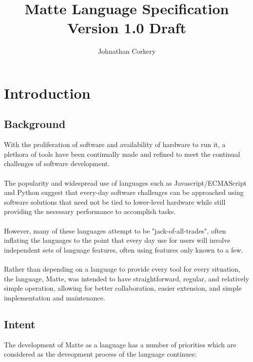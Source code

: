 \documentclass[12pt,letterpaper]{report}
\author{Johnathan Corkery}
\title{Matte Language Specification\\
\small Version 1.0 Draft
}
\begin{document}
\maketitle
\tableofcontents


\chapter{Introduction}\label{Introduction}
\section{Background}\label{Background}

With the proliferation of software and availability of hardware to run it, a
plethora of tools have been continually made and refined to meet the 
continual challenges of software development. 
\\\\
The popularity and widespread use of languages such as Javascript/ECMAScript and 
Python suggest that every-day software challenges can be approached using 
software solutions that need not be tied to lower-level hardware while 
still providing the necessary performance to accomplish tasks.
\\\\
However, many of these languages attempt to be "jack-of-all-trades", often 
inflating the languages to the point that every day use for users will involve
independent sets of language features, often using features only known to a few.
\\\\
Rather than depending on a language to provide every tool for every situation,
the language, Matte, was intended to have straightforward, regular, and 
relatively simple operation, allowing for better collaboration, easier 
extension, and simple implementation and maintenance.
  
\section{Intent}\label{Intent}

The development of Matte as a language has a number of priorities which are 
considered as the deveopment process of the language continues:
\end{document}

